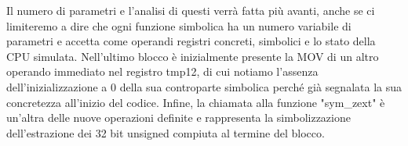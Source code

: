 \documentclass[Lau, oneside]{sapthesis}%
\begin{document}
\newline
Il numero di parametri e l'analisi di questi verrà fatta più avanti, anche se ci limiteremo a dire che ogni funzione simbolica ha un numero variabile di parametri e accetta come operandi registri concreti, simbolici e lo stato della CPU simulata.
\newline \newline
Nell'ultimo blocco è inizialmente presente la MOV di un altro operando immediato nel registro tmp12, di cui notiamo l'assenza dell'inizializzazione a 0 della sua controparte simbolica perché già segnalata la sua concretezza all'inizio del codice.
\newline
Infine, la chiamata alla funzione "sym\_zext" è un'altra delle nuove operazioni definite e rappresenta la simbolizzazione dell'estrazione dei 32 bit unsigned compiuta al termine del blocco.
\end{document}
